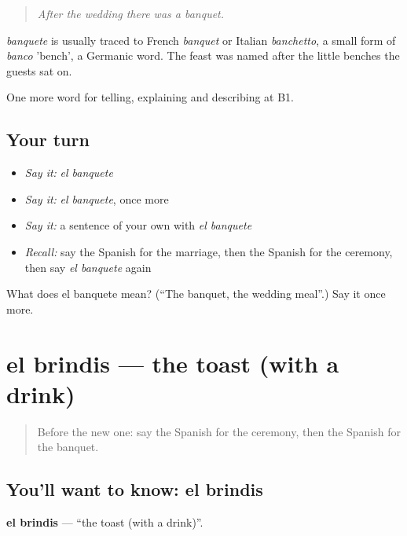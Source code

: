 \begin{quote}
\emph{After the wedding there was a banquet.}
\end{quote}

\begin{cousinweb}
\emph{banquete} is usually traced to French \emph{banquet} or Italian \emph{banchetto}, a small form of \emph{banco} 'bench', a Germanic word. The feast was named after the little benches the guests sat on.
\end{cousinweb}

\begin{grammarlens}[title={What you've built}]
One more word for telling, explaining and describing at B1.
\end{grammarlens}

\subsection*{Your turn}
\begin{itemize}
\raggedright
  \item \emph{Say it:} \emph{el banquete}
  \item \emph{Say it:} \emph{el banquete}, once more
  \item \emph{Say it:} a sentence of your own with \emph{el banquete}
  \item \emph{Recall:} say the Spanish for the marriage, then the Spanish for the ceremony, then say \emph{el banquete} again
\end{itemize}

\begin{tcolorbox}[breakable,colback=teal!4,colframe=teal!35!black,title={Before you move on}]
What does el banquete mean? (\textquotedblleft{}The banquet, the wedding meal\textquotedblright{}.) Say it once more.
\end{tcolorbox}
\section[el brindis]{el brindis — the toast (with a drink)}

\label{lesson:ES-C548-brindis}



\begin{quote}
Before the new one: say the Spanish for the ceremony, then the Spanish for the banquet.
\end{quote}

\subsection*{You'll want to know: el brindis}
\textbf{el brindis} — \textquotedblleft{}the toast (with a drink)\textquotedblright{}.

